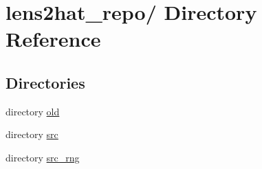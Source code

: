 \section{lens2hat\-\_\-repo/ Directory Reference}
\label{dir_65c7957135029fe5af66781a2e8c3d94}
\subsection*{Directories}
\begin{DoxyCompactItemize}
\item 
directory \hyperlink{dir_ec1fa73d4fce8ec579def042c88b8e19}{old}
\item 
directory \hyperlink{dir_c24a4ff7dc56f333cdcde7775738ef0f}{src}
\item 
directory \hyperlink{dir_aef67e3e4769f69e7caf56db0e8a1f45}{src\-\_\-rng}
\end{DoxyCompactItemize}
